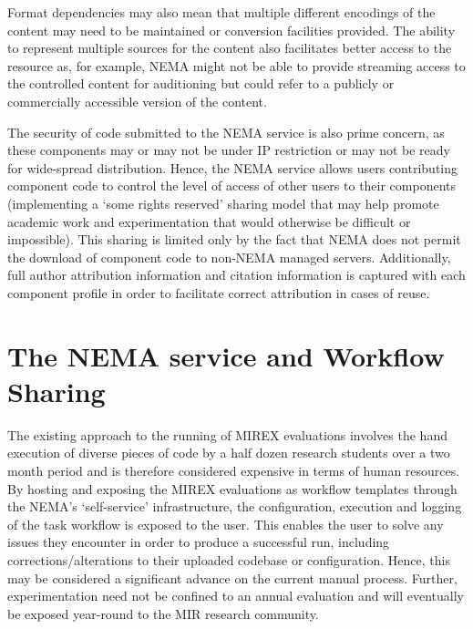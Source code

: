 \documentclass[conference]{IEEEtran}
\begin{document}
Format dependencies may also mean that multiple different encodings of the content may need to be maintained or conversion facilities provided. The ability to represent multiple sources for the content also facilitates better access to the resource as, for example, NEMA might not be able to provide streaming access to the controlled content for auditioning but could refer to a publicly or commercially accessible version of the content. 

The security of code submitted to the NEMA service is also prime concern, as these components may or may not be under IP restriction or may not be ready for wide-spread distribution. Hence, the NEMA service allows users contributing component code to control the level of access of other users to their components (implementing a `some rights reserved' sharing model that may help promote academic work and experimentation that would otherwise be difficult or impossible). This sharing is limited only by the fact that NEMA does not permit the download of component code to non-NEMA managed servers.
Additionally, full author attribution information and citation information is captured with each component profile in order to facilitate correct attribution in cases of reuse.

\section{The NEMA service and Workflow Sharing}
The existing approach to the running of MIREX evaluations involves the hand execution of diverse pieces of code by a half dozen research students over a two month period and is therefore considered expensive in terms of human resources. By hosting and exposing the MIREX evaluations as workflow templates through the NEMA's `self-service' infrastructure, the configuration, execution and logging of the task workflow is exposed to the user. This enables the user to solve any issues they encounter in order to produce a successful run, including corrections/alterations to their uploaded codebase or configuration. Hence, this may be considered a significant advance on the current manual process.  Further, experimentation need not be confined to an annual evaluation and will eventually be exposed year-round to the MIR research community.
\end{document}
